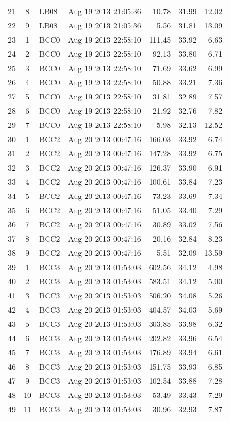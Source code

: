 \begin{longtable}{ccllrrr}
21&8&LB08&Aug 19 2013 21:05:36&10.78&31.99&12.02\\
22&9&LB08&Aug 19 2013 21:05:36&5.56&31.81&13.09\\
\hline 
23&1&BCC0&Aug 19 2013 22:58:10&111.45&33.92&6.63\\
24&2&BCC0&Aug 19 2013 22:58:10&92.13&33.80&6.71\\
25&3&BCC0&Aug 19 2013 22:58:10&71.69&33.62&6.99\\
26&4&BCC0&Aug 19 2013 22:58:10&50.88&33.21&7.36\\
27&5&BCC0&Aug 19 2013 22:58:10&31.81&32.89&7.57\\
28&6&BCC0&Aug 19 2013 22:58:10&21.92&32.76&7.82\\
29&7&BCC0&Aug 19 2013 22:58:10&5.98&32.13&12.52\\
\hline 
30&1&BCC2&Aug 20 2013 00:47:16&166.03&33.92&6.74\\
31&2&BCC2&Aug 20 2013 00:47:16&147.28&33.92&6.75\\
32&3&BCC2&Aug 20 2013 00:47:16&126.37&33.90&6.91\\
33&4&BCC2&Aug 20 2013 00:47:16&100.61&33.84&7.23\\
34&5&BCC2&Aug 20 2013 00:47:16&73.23&33.69&7.34\\
35&6&BCC2&Aug 20 2013 00:47:16&51.05&33.40&7.29\\
36&7&BCC2&Aug 20 2013 00:47:16&30.89&33.02&7.56\\
37&8&BCC2&Aug 20 2013 00:47:16&20.16&32.84&8.23\\
38&9&BCC2&Aug 20 2013 00:47:16&5.51&32.09&13.59\\
\hline 
39&1&BCC3&Aug 20 2013 01:53:03&602.56&34.12&4.98\\
40&2&BCC3&Aug 20 2013 01:53:03&583.51&34.12&5.00\\
41&3&BCC3&Aug 20 2013 01:53:03&506.20&34.08&5.26\\
42&4&BCC3&Aug 20 2013 01:53:03&404.57&34.03&5.69\\
43&5&BCC3&Aug 20 2013 01:53:03&303.85&33.98&6.32\\
44&6&BCC3&Aug 20 2013 01:53:03&202.82&33.96&6.54\\
45&7&BCC3&Aug 20 2013 01:53:03&176.89&33.94&6.61\\
46&8&BCC3&Aug 20 2013 01:53:03&151.75&33.93&6.85\\
47&9&BCC3&Aug 20 2013 01:53:03&102.54&33.88&7.28\\
48&10&BCC3&Aug 20 2013 01:53:03&53.49&33.43&7.29\\
49&11&BCC3&Aug 20 2013 01:53:03&30.96&32.93&7.87\\

\end{longtable}
